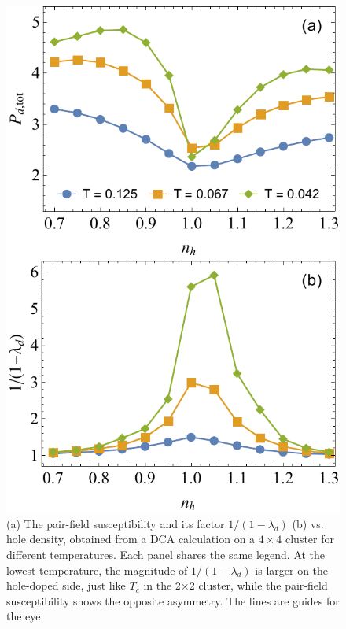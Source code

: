 \documentclass[reprint,nofootinbib,nobibnotes,amsmath,amssymb,aps,prb,floatfix]{revtex4-2}
\begin{document}
\begin{figure}[ht]
\includegraphics[width=0.8\linewidth]{4by4asymmetry.pdf}
\caption{(a) The pair-field susceptibility and its factor $1/(1-\lambda_d)$  (b) vs. hole density, obtained from a DCA calculation on a $4\times 4$ cluster for different temperatures. Each panel shares the same legend. At the lowest temperature, the magnitude of $1/(1-\lambda_d)$ is larger on the hole-doped side, just like $T_c$ in the 2$\times$2 cluster, while the pair-field susceptibility shows the opposite asymmetry. The lines are guides for the eye.
}
\label{dopedepend4by4}
\end{figure}
\end{document}
